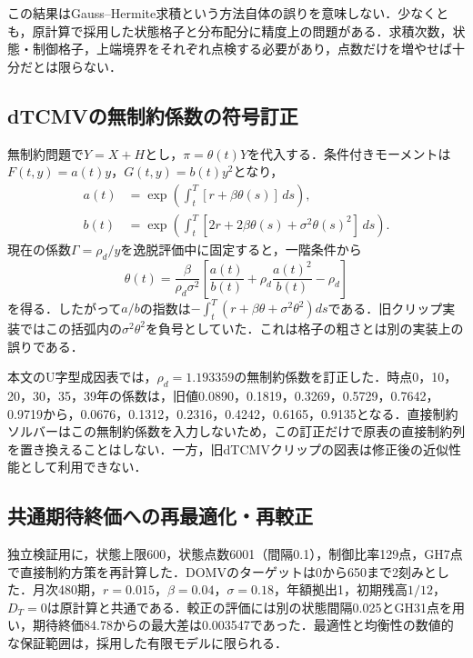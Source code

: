 \documentclass[10pt,a4paper]{article}
\theoremstyle{plain}
\theoremstyle{definition}
\begin{document}
この結果はGauss--Hermite求積という方法自体の誤りを意味しない．少なくとも，原計算で採用した状態格子と分布配分に精度上の問題がある．求積次数，状態・制御格子，上端境界をそれぞれ点検する必要があり，点数だけを増やせば十分だとは限らない．

\subsection{dTCMVの無制約係数の符号訂正}
無制約問題で$Y=X+H$とし，$\pi=\theta(t)Y$を代入する．条件付きモーメントは$F(t,y)=a(t)y$，$G(t,y)=b(t)y^2$となり，
\begin{align}
a(t)&=\exp\!\left(\int_t^T[r+\beta\theta(s)]\,ds\right),\\
b(t)&=\exp\!\left(\int_t^T[2r+2\beta\theta(s)+\sigma^2\theta(s)^2]\,ds\right).
\end{align}
現在の係数$\Gamma=\rho_d/y$を逸脱評価中に固定すると，一階条件から
\begin{equation}
\theta(t)=\frac{\beta}{\rho_d\sigma^2}
\left[\frac{a(t)}{b(t)}+\rho_d\frac{a(t)^2}{b(t)}-\rho_d\right]
\end{equation}
を得る．したがって$a/b$の指数は$-\int_t^T(r+\beta\theta+\sigma^2\theta^2)ds$である．旧クリップ実装ではこの括弧内の$\sigma^2\theta^2$を負号としていた．これは格子の粗さとは別の実装上の誤りである．

本文のU字型成因表では，$\rho_d=1.193359$の無制約係数を訂正した．時点0，10，20，30，35，39年の係数は，旧値0.0890，0.1819，0.3269，0.5729，0.7642，0.9719から，0.0676，0.1312，0.2316，0.4242，0.6165，0.9135となる．直接制約ソルバーはこの無制約係数を入力しないため，この訂正だけで原表の直接制約列を置き換えることはしない．一方，旧dTCMVクリップの図表は修正後の近似性能として利用できない．

\subsection{共通期待終価への再最適化・再較正}
独立検証用に，状態上限600，状態点数6001（間隔0.1），制御比率129点，GH7点で直接制約方策を再計算した．DOMVのターゲットは0から650まで2刻みとした．月次480期，$r=0.015$，$\beta=0.04$，$\sigma=0.18$，年額拠出1，初期残高$1/12$，$D_T=0$は原計算と共通である．較正の評価には別の状態間隔0.025とGH31点を用い，期待終価84.78からの最大差は0.003547であった．最適性と均衡性の数値的な保証範囲は，採用した有限モデルに限られる．
\end{document}
